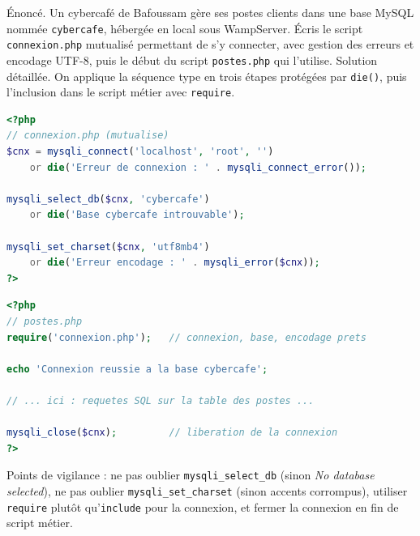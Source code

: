 \documentclass[11pt]{article}
\begin{document}
\begin{exoresolu}
Énoncé. Un cybercafé de Bafoussam gère ses postes clients dans une base MySQL nommée \texttt{cybercafe}, hébergée en local sous WampServer. Écris le script \texttt{connexion.php} mutualisé permettant de s'y connecter, avec gestion des erreurs et encodage UTF-8, puis le début du script \texttt{postes.php} qui l'utilise.
\tcblower
Solution détaillée. On applique la séquence type en trois étapes protégées par \texttt{die()}, puis l'inclusion dans le script métier avec \texttt{require}.
\begin{lstlisting}[language=Php]
<?php
// connexion.php (mutualise)
$cnx = mysqli_connect('localhost', 'root', '')
    or die('Erreur de connexion : ' . mysqli_connect_error());

mysqli_select_db($cnx, 'cybercafe')
    or die('Base cybercafe introuvable');

mysqli_set_charset($cnx, 'utf8mb4')
    or die('Erreur encodage : ' . mysqli_error($cnx));
?>
\end{lstlisting}
\begin{lstlisting}[language=Php]
<?php
// postes.php
require('connexion.php');   // connexion, base, encodage prets

echo 'Connexion reussie a la base cybercafe';

// ... ici : requetes SQL sur la table des postes ...

mysqli_close($cnx);         // liberation de la connexion
?>
\end{lstlisting}
Points de vigilance : ne pas oublier \texttt{mysqli\_select\_db} (sinon \emph{No database selected}), ne pas oublier \texttt{mysqli\_set\_charset} (sinon accents corrompus), utiliser \texttt{require} plutôt qu'\texttt{include} pour la connexion, et fermer la connexion en fin de script métier.
\end{exoresolu}
\end{document}
